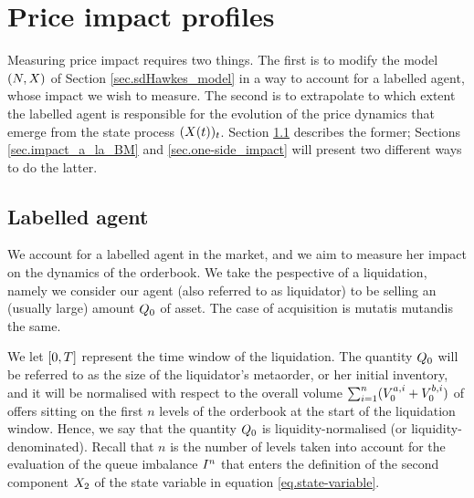 \documentclass[10pt]{article}
\begin{document}
\section{Price impact profiles}\label{sec.price_impact_profiles}

Measuring price impact requires two things. The first is to modify the  model $(\multiCountingProc,\stateVariable)$ of Section \ref{sec.sdHawkes_model} in a way to account for a labelled agent, whose impact we wish to measure. The second is to extrapolate to which extent the labelled agent is responsible for the evolution of the price dynamics that emerge from the state process $(\stateVariable(t))_{t}$.  Section \ref{sec.labelled_agent} describes the former; Sections \ref{sec.impact_a_la_BM} and \ref{sec.one-side_impact} will present two different ways to do the latter.

\subsection{Labelled agent}\label{sec.labelled_agent}
We account for a labelled agent in the market, and we aim to measure her impact on the dynamics of the orderbook. We take the pespective of a liquidation, namely we consider our agent (also referred to as liquidator) to be selling an (usually large) amount $\metaorderSize$ of asset. The case of acquisition is mutatis mutandis the same. 

We let $\timeWindow$ represent the time window of the liquidation. The quantity $\metaorderSize$ will be referred to as the size of the liquidator's metaorder, or her initial inventory, and it will be normalised with respect to the overall volume $\sum_{i=1}^{n}(\nthBestAskVolume[i]_{0} + \nthBestBidVolume[i]_{0})$ of offers sitting on the first $n$ levels of the orderbook  at the start of the liquidation window. Hence, we say that the quantity $\metaorderSize$ is liquidity-normalised (or liquidity-denominated). Recall that $n$ is the number of levels taken into account for the evaluation of the queue imbalance $\volumeImbalance^n$ that enters the definition of the second component $\stateVariable_2$ of the state variable in equation \eqref{eq.state-variable}.     
\end{document}
